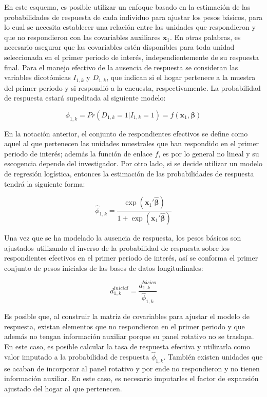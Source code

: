 \documentclass[
  12pt,
]{book}
\begin{document}
En este esquema, es posible utilizar un enfoque basado en la estimación de las probabilidades de respuesta de cada individuo para ajustar los pesos básicos, para lo cual se necesita establecer una relación entre las unidades que respondieron y que no respondieron con las covariables auxiliares \(\mathbf{x}_{1}\). En otras palabras, es necesario asegurar que las covariables estén disponibles para toda unidad seleccionada en el primer periodo de interés, independientemente de su respuesta final. Para el manejo efectivo de la ausencia de respuesta se consideran las variables dicotómicas \(I_{1, k}\) y \(D_{1, k}\), que indican si el hogar pertenece a la muestra del primer periodo y si respondió a la encuesta, respectivamente. La probabilidad de respuesta estará supeditada al siguiente modelo:

\[
\phi_{1, k} = Pr(D_{1, k} = 1|I_{1, k} = 1) = f(\mathbf{x}_{1}, \boldsymbol\beta)
\]

En la notación anterior, el conjunto de respondientes efectivos se define como aquel al que pertenecen las unidades muestrales que han respondido en el primer periodo de interés; además la función de enlace \(f\), es por lo general no lineal y su escogencia depende del investigador. Por otro lado, si se decide utilizar un modelo de regresión logística, entonces la estimación de las probabilidades de respuesta tendrá la siguiente forma:

\[
\hat{\phi}_{1, k} = \frac{\exp{(\mathbf{x}_{1}' \hat{\boldsymbol\beta})}}{1 +\exp{(\mathbf{x}_{1}' \hat{\boldsymbol\beta})}}
\]

Una vez que se ha modelado la ausencia de respuesta, los pesos básicos son ajustados utilizando el inverso de la probabilidad de respuesta sobre los respondientes efectivos en el primer periodo de interés, así se conforma el primer conjunto de pesos iniciales de las bases de datos longitudinales:

\[
d_{1, k}^{inicial} = \frac{d_{1, k}^{básico}}{\hat{\phi}_{1, k}}
\]

Es posible que, al construir la matriz de covariables para ajustar el modelo de respuesta, existan elementos que no respondieron en el primer periodo y que además no tengan información auxiliar porque su panel rotativo no se traslapa. En este caso, es posible calcular la tasa de respuesta efectiva y utilizarla como valor imputado a la probabilidad de respuesta \(\hat\phi_{1, k}\). También existen unidades que se acaban de incorporar al panel rotativo y por ende no respondieron y no tienen información auxiliar. En este caso, es necesario imputarles el factor de expansión ajustado del hogar al que pertenecen.
\end{document}
